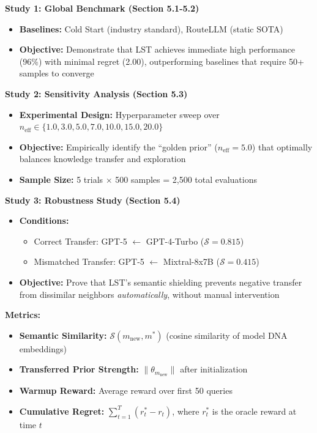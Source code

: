 \documentclass[sigconf,nonacm]{acmart}
\begin{document}
\textbf{Study 1: Global Benchmark (Section 5.1-5.2)}
\begin{itemize}
    \item \textbf{Baselines:} Cold Start (industry standard), RouteLLM (static SOTA)
    \item \textbf{Objective:} Demonstrate that LST achieves immediate high performance (96\%) with minimal regret (2.00), outperforming baselines that require 50+ samples to converge
\end{itemize}

\textbf{Study 2: Sensitivity Analysis (Section 5.3)}
\begin{itemize}
    \item \textbf{Experimental Design:} Hyperparameter sweep over $n_{\text{eff}} \in \{1.0, 3.0, 5.0, 7.0, 10.0, 15.0, 20.0\}$
    \item \textbf{Objective:} Empirically identify the ``golden prior'' ($n_{\text{eff}} = 5.0$) that optimally balances knowledge transfer and exploration
    \item \textbf{Sample Size:} 5 trials $\times$ 500 samples = 2,500 total evaluations
\end{itemize}

\textbf{Study 3: Robustness Study (Section 5.4)}
\begin{itemize}
    \item \textbf{Conditions:} 
        \begin{itemize}
            \item Correct Transfer: GPT-5 $\leftarrow$ GPT-4-Turbo ($\mathcal{S} = 0.815$)
            \item Mismatched Transfer: GPT-5 $\leftarrow$ Mixtral-8x7B ($\mathcal{S} = 0.415$)
        \end{itemize}
    \item \textbf{Objective:} Prove that LST's semantic shielding prevents negative transfer from dissimilar neighbors \textit{automatically}, without manual intervention
\end{itemize}

\textbf{Metrics:}
\begin{itemize}
    \item \textbf{Semantic Similarity:} $\mathcal{S}(m_{\text{new}}, m^*)$ (cosine similarity of model DNA embeddings)
    \item \textbf{Transferred Prior Strength:} $\|\theta_{m_{\text{new}}}\|$ after initialization
    \item \textbf{Warmup Reward:} Average reward over first 50 queries
    \item \textbf{Cumulative Regret:} $\sum_{t=1}^{T} (r^*_t - r_t)$, where $r^*_t$ is the oracle reward at time $t$
\end{itemize}
\end{document}
